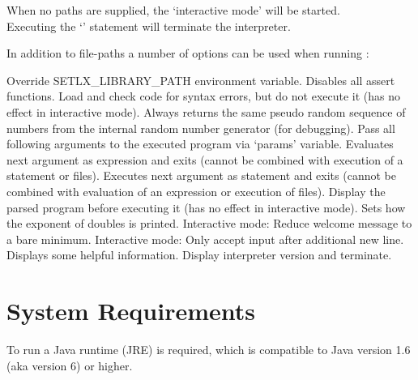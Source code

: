 When no paths are supplied, the `interactive mode' will be started.\\
Executing the `' statement will terminate the interpreter.


In addition to file-paths a number of options can be used when running \setlX{}:

\begin{itemize}
	      {Override SETLX\_LIBRARY\_PATH environment variable.}
	      {Disables all assert functions.}
	      {Load and check code for syntax errors, but do not execute it (has no effect in interactive mode).}
	      {Always returns the same pseudo random sequence of numbers from the internal random number generator (for debugging).}
	      {Pass all following arguments to the executed program via `params' variable.}
	      {Evaluates next argument as expression and exits (cannot be combined with execution of a statement or files).}
	      {Executes next argument as statement and exits (cannot be combined with evaluation of an expression or execution of files).}
          {Display the parsed program before executing it (has no effect in interactive mode).}
          {Sets how the exponent of doubles is printed.}
	      {Interactive mode: Reduce welcome message to a bare minimum.}
	      {Interactive mode: Only accept input after additional new line.}
	      {Displays some helpful information.}
          {Display interpreter version and terminate.}
\end{itemize}

\section{System Requirements}

To run \setlX{} a Java runtime (JRE) is required, which is compatible to Java version 1.6 (aka version 6) or higher.

